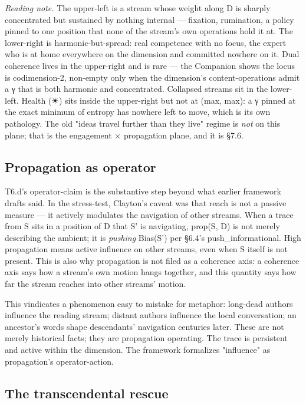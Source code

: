 \documentclass[11pt, openany]{book}
\begin{document}
\textit{Reading note.} The upper-left is a stream whose weight along D is sharply concentrated but sustained by nothing internal --- fixation, rumination, a policy pinned to one position that none of the stream's own operations hold it at. The lower-right is harmonic-but-spread: real competence with no focus, the expert who is at home everywhere on the dimension and committed nowhere on it. Dual coherence lives in the upper-right and is rare --- the Companion shows the locus is codimension-2, non-empty only when the dimension's content-operations admit a γ that is both harmonic and concentrated. Collapsed streams sit in the lower-left. Health (☀) sits inside the upper-right but not at (max, max): a γ pinned at the exact minimum of entropy has nowhere left to move, which is its own pathology. The old "ideas travel further than they live" regime is \textit{not} on this plane; that is the engagement × propagation plane, and it is §7.6.

\subsection{Propagation as operator}

T6.d's operator-claim is the substantive step beyond what earlier framework drafts said. In the stress-test, Clayton's caveat was that reach is not a passive measure --- it actively modulates the navigation of other streams. When a trace from S sits in a position of D that S' is navigating, prop(S, D) is not merely describing the ambient; it is \textit{pushing} Bias(S') per §6.4's push\_\allowbreak{}informational. High propagation means active influence on other streams, even when S itself is not present. This is also why propagation is not filed as a coherence axis: a coherence axis says how a stream's own motion hangs together, and this quantity says how far the stream reaches into other streams' motion.

This vindicates a phenomenon easy to mistake for metaphor: long-dead authors influence the reading stream; distant authors influence the local conversation; an ancestor's words shape descendants' navigation centuries later. These are not merely historical facts; they are propagation operating. The trace is persistent and active within the dimension. The framework formalizes "influence" as propagation's operator-action.

\subsection{The transcendental rescue}
\end{document}
